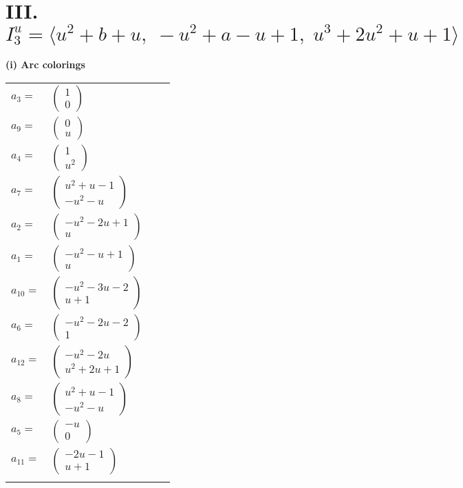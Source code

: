 \documentclass[1p]{elsarticle_modified}
\theoremstyle{definition}
\begin{document}
\centering \section*{III. $I^u_{3}= \langle u^2+b+u,\;- u^2+a- u+1,\;u^3+2 u^2+u+1 \rangle$}
\flushleft \textbf{(i) Arc colorings}\\
\begin{tabular}{m{7pt} m{180pt} m{7pt} m{180pt} }
\flushright $a_{3}=$&$\begin{pmatrix}1\\0\end{pmatrix}$ \\
\flushright $a_{9}=$&$\begin{pmatrix}0\\u\end{pmatrix}$ \\
\flushright $a_{4}=$&$\begin{pmatrix}1\\u^2\end{pmatrix}$ \\
\flushright $a_{7}=$&$\begin{pmatrix}u^2+u-1\\- u^2- u\end{pmatrix}$ \\
\flushright $a_{2}=$&$\begin{pmatrix}- u^2-2 u+1\\u\end{pmatrix}$ \\
\flushright $a_{1}=$&$\begin{pmatrix}- u^2- u+1\\u\end{pmatrix}$ \\
\flushright $a_{10}=$&$\begin{pmatrix}- u^2-3 u-2\\u+1\end{pmatrix}$ \\
\flushright $a_{6}=$&$\begin{pmatrix}- u^2-2 u-2\\1\end{pmatrix}$ \\
\flushright $a_{12}=$&$\begin{pmatrix}- u^2-2 u\\u^2+2 u+1\end{pmatrix}$ \\
\flushright $a_{8}=$&$\begin{pmatrix}u^2+u-1\\- u^2- u\end{pmatrix}$ \\
\flushright $a_{5}=$&$\begin{pmatrix}- u\\0\end{pmatrix}$ \\
\flushright $a_{11}=$&$\begin{pmatrix}-2 u-1\\u+1\end{pmatrix}$\\&\end{tabular}
\end{document}
